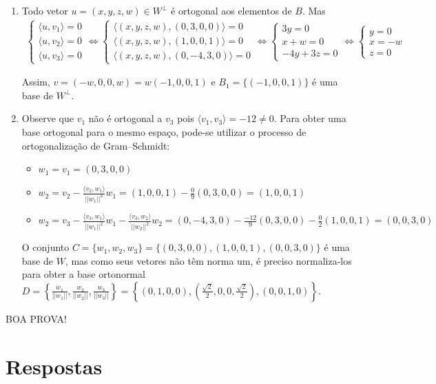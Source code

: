 \documentclass[12pt,a4paper]{article}
\newcommand{\norm}[1]{\left|\left|{#1}\right|\right|}
\begin{document}
\begin{ExerciseList}
\begin{enumerate}
\item Todo vetor $u = (x,y,z,w) \in W^\perp$ é ortogonal aos elementos de $B$. Mas
\begin{align*}
\begin{cases}
\langle u, v_1\rangle = 0\\
\langle u, v_2\rangle = 0\\
\langle u, v_3\rangle = 0
\end{cases}
\Leftrightarrow
\begin{cases}
\langle (x,y,z,w), (0,3,0,0)\rangle = 0\\
\langle (x,y,z,w), (1,0,0,1)\rangle = 0\\
\langle (x,y,z,w), (0,-4,3,0)\rangle = 0
\end{cases}
\Leftrightarrow
\begin{cases}
3y = 0\\
x + w = 0\\
- 4y + 3z = 0
\end{cases}
\Leftrightarrow
\begin{cases}
y = 0 \\
x = - w\\
z = 0
\end{cases}
\end{align*}

Assim, $v = (-w,0,0,w) = w(-1,0,0,1)$ e $B_1 = \{ (-1,0,0,1) \}$ é uma base de $W^\perp$.

\item Observe que $v_1$ não é ortogonal a $v_3$ pois $\langle v_1, v_3 \rangle = -12 \neq 0$. Para obter uma base ortogonal para o mesmo espaço, pode-se utilizar o processo de ortogonalização de Gram–Schmidt:
\begin{itemize}
\item $w_1
= v_1
= (0,3,0,0)$
\item $w_2
= v_2 - \frac{\langle v_2, w_1 \rangle}{\norm{w_1}^2}w_1
= (1,0,0,1) - \frac{0}{9}(0,3,0,0)
= (1,0,0,1)$
\item $w_2
= v_3 - \frac{\langle v_3, w_1 \rangle}{\norm{w_1}^2}w_1
      - \frac{\langle v_3, w_2 \rangle}{\norm{w_2}^2}w_2
= (0,-4,3,0) - \frac{-12}{9}(0,3,0,0)
             - \frac{0}{2}(1,0,0,1)
= (0,0,3,0)$
\end{itemize}
O conjunto $C = \{ w_1, w_2, w_3 \} = \{ (0,3,0,0), (1,0,0,1), (0,0,3,0) \}$ é uma base de $W$, mas como seus vetores não têm norma um, é preciso normaliza-los para obter a base ortonormal $D = \left\{ \frac{w_1}{\norm{w_1}}, \frac{w_2}{\norm{w_2}}, \frac{w_3}{\norm{w_3}} \right\} = \left\{ (0,1,0,0), (\frac{\sqrt{2}}{2},0,0,\frac{\sqrt{2}}{2}), (0,0,1,0) \right\}$.
\end{enumerate}
\end{ExerciseList}

\begin{center}
BOA PROVA!
\end{center}

\newpage
\restoregeometry
\section*{Respostas}
\shipoutAnswer
\end{document}

